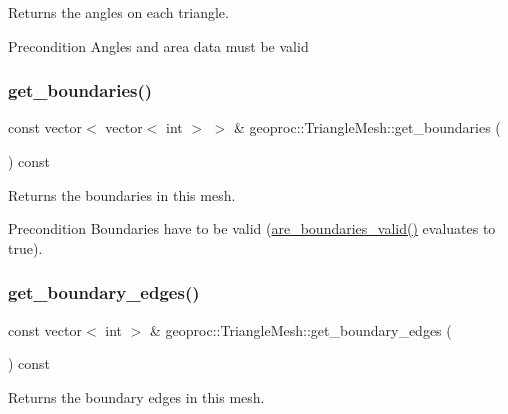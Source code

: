 Returns the angles on each triangle. 

\begin{DoxyPrecond}{Precondition}
Angles and area data must be valid 
\end{DoxyPrecond}
\mbox{\label{classgeoproc_1_1TriangleMesh_a07a91ab963592c2560eec6409194ba66}} 
\subsubsection{\texorpdfstring{get\+\_\+boundaries()}{get\_boundaries()}}
{\footnotesize\ttfamily const vector$<$ vector$<$ int $>$ $>$ \& geoproc\+::\+Triangle\+Mesh\+::get\+\_\+boundaries (\begin{DoxyParamCaption}{ }\end{DoxyParamCaption}) const}



Returns the boundaries in this mesh. 

\begin{DoxyPrecond}{Precondition}
Boundaries have to be valid (\hyperlink{classgeoproc_1_1TriangleMesh_a409e399857e1a1abc9f23918ff5f5860}{are\+\_\+boundaries\+\_\+valid()} evaluates to true). 
\end{DoxyPrecond}
\mbox{\label{classgeoproc_1_1TriangleMesh_a0cf960fcf069954b51ce567304359d4e}} 
\subsubsection{\texorpdfstring{get\+\_\+boundary\+\_\+edges()}{get\_boundary\_edges()}}
{\footnotesize\ttfamily const vector$<$ int $>$ \& geoproc\+::\+Triangle\+Mesh\+::get\+\_\+boundary\+\_\+edges (\begin{DoxyParamCaption}{ }\end{DoxyParamCaption}) const}



Returns the boundary edges in this mesh. 

